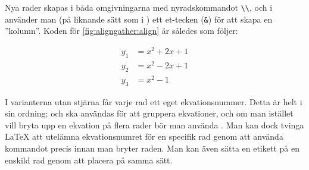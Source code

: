 \documentclass[10pt,../../a4.tex]{subfiles}
\begin{document}
Nya rader skapas i båda omgivningarna med nyradskommandot \verb|\\|, och
i  använder man (på liknande sätt som i ) ett
et-tecken (\verb|&|) för att skapa en ”kolumn”. Koden för \cref{fig:aligngather:align} är således som följer:
\begin{latexcode}
\begin{align}
y_1 &= x^2 + 2x + 1 \\
y_2 &= x^2 - 2x + 1 \\
y_3 &= x^2 - 1
\end{align}
\end{latexcode}

I varianterna utan stjärna får varje rad ett eget ekvationsnummer. Detta
är helt i sin ordning;  och  ska användas för att
gruppera ekvationer, och om man istället vill bryta upp en ekvation på
flera rader bör man använda . Man kan dock tvinga \LaTeX{}
att utelämna ekvationsnumret för en specifik rad genom att använda
kommandot  precis innan man bryter raden. Man kan även
sätta en etikett på en enskild rad genom att placera  på samma
sätt.
\end{document}
